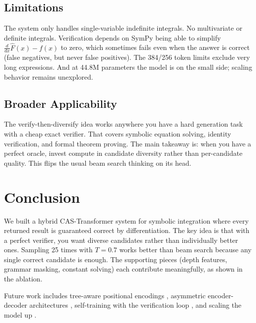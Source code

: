\documentclass[conference]{IEEEtran}
\begin{document}
\subsection{Limitations}

The system only handles single-variable indefinite integrals. No multivariate or definite integrals. Verification depends on SymPy being able to simplify $\frac{d}{dx}\hat{F}(x) - f(x)$ to zero, which sometimes fails even when the answer is correct (false negatives, but never false positives). The 384/256 token limits exclude very long expressions. And at 44.8M parameters the model is on the small side; scaling behavior \cite{b26} remains unexplored.

\subsection{Broader Applicability}

The verify-then-diversify idea works anywhere you have a hard generation task with a cheap exact verifier. That covers symbolic equation solving, identity verification, and formal theorem proving. The main takeaway is: when you have a perfect oracle, invest compute in candidate diversity rather than per-candidate quality. This flips the usual beam search thinking on its head.

\section{Conclusion}

We built a hybrid CAS-Transformer system for symbolic integration where every returned result is guaranteed correct by differentiation. The key idea is that with a perfect verifier, you want diverse candidates rather than individually better ones. Sampling 25 times with $T = 0.7$ works better than beam search because any single correct candidate is enough. The supporting pieces (depth features, grammar masking, constant solving) each contribute meaningfully, as shown in the ablation.

Future work includes tree-aware positional encodings \cite{b30b}, asymmetric encoder-decoder architectures \cite{b8}, self-training with the verification loop \cite{b25}, and scaling the model up \cite{b26}.
\end{document}
